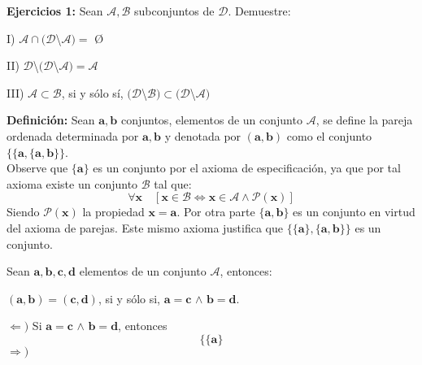 \textbf{Ejercicios 1:} Sean $\mathcal{A,B}$ subconjuntos de $\mathcal{D}$. Demuestre:
\begin{iteritem}
\item   I) $\mathcal{A}\cap(\mathcal{D}$\textbackslash$\mathcal{A})=$ \O
\item  II) $\mathcal{D}$\textbackslash$(\mathcal{D}$\textbackslash$\mathcal{A})=\mathcal{A}$
\item III) $\mathcal{A}\subset\mathcal{B}$, si y sólo sí, $(\mathcal{D}$\textbackslash$\mathcal{B})\subset(\mathcal{D}$\textbackslash$\mathcal{A})$\\
\end{iteritem}

\textbf{Definición:} Sean $\mathbf{a,b}$ conjuntos, elementos de un conjunto $\mathcal{A}$, se define la pareja ordenada determinada por $\mathbf{a,b}$ y denotada por $(\mathbf{a,b})$ como el conjunto $\{\{\mathbf{a},\{\mathbf{a,b}\}\}$.\\

Observe que $\{\mathbf{a}\}$ es un conjunto por el axioma de especificación, ya que por tal axioma existe un conjunto $\mathcal{B}$ tal que:
\[\forall\mathbf{x}\quad[\mathbf{x}\in\mathcal{B} \Longleftrightarrow \mathbf{x}\in\mathcal{A} \wedge \mathcal{P}(\mathbf{x}) ]\] 
Siendo $\mathcal{P}(\mathbf{x})$ la propiedad $\mathbf{x}=\mathbf{a}$. Por otra parte $\{\mathbf{a,b}\}$ es un conjunto en virtud del axioma de parejas. Este mismo axioma justifica que $\{\{\mathbf{a}\},\{\mathbf{a,b}\}\}$ es un conjunto. \\

\begin{proposition}
	Sean $\mathbf{a,b,c,d}$ elementos de un conjunto $\mathcal{A}$, entonces:
	\begin{centering}
	$(\mathbf{a},\mathbf{b})=(\mathbf{c},\mathbf{d})$, si y sólo si, $\mathbf{a}=\mathbf{c}$ $\wedge$ $\mathbf{b}=\mathbf{d}$.
	\end{centering}
\end{proposition} 
\begin{proof2}
$\Longleftarrow)$ Si $\mathbf{a}=\mathbf{c}$ $\wedge$ $\mathbf{b}=\mathbf{d}$, entonces
	\[ \{\{\mathbf{a} \}\]
$\Longrightarrow)$
\end{proof2}











